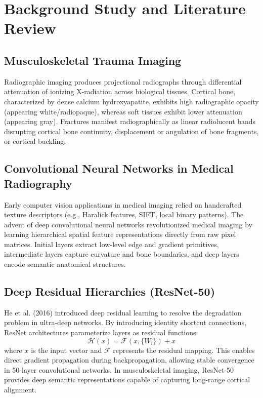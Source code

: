 \documentclass[12pt, a4paper]{report}
\begin{document}
\newpage
\chapter{Background Study and Literature Review}

\section{Musculoskeletal Trauma Imaging}
Radiographic imaging produces projectional radiographs through differential attenuation of ionizing X-radiation across biological tissues. Cortical bone, characterized by dense calcium hydroxyapatite, exhibits high radiographic opacity (appearing white/radiopaque), whereas soft tissues exhibit lower attenuation (appearing gray). Fractures manifest radiographically as linear radiolucent bands disrupting cortical bone continuity, displacement or angulation of bone fragments, or cortical buckling.

\section{Convolutional Neural Networks in Medical Radiography}
Early computer vision applications in medical imaging relied on handcrafted texture descriptors (e.g., Haralick features, SIFT, local binary patterns). The advent of deep convolutional neural networks revolutionized medical imaging by learning hierarchical spatial feature representations directly from raw pixel matrices. Initial layers extract low-level edge and gradient primitives, intermediate layers capture curvature and bone boundaries, and deep layers encode semantic anatomical structures.

\section{Deep Residual Hierarchies (ResNet-50)}
He et al. (2016) introduced deep residual learning to resolve the degradation problem in ultra-deep networks. By introducing identity shortcut connections, ResNet architectures parameterize layers as residual functions:
\begin{equation}
    \mathcal{H}(x) = \mathcal{F}(x, \{W_i\}) + x
\end{equation}
where $x$ is the input vector and $\mathcal{F}$ represents the residual mapping. This enables direct gradient propagation during backpropagation, allowing stable convergence in 50-layer convolutional networks. In musculoskeletal imaging, ResNet-50 provides deep semantic representations capable of capturing long-range cortical alignment.
\end{document}
